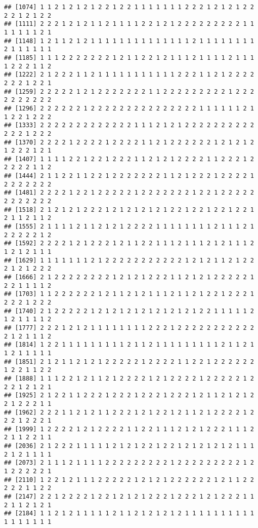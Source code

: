 \documentclass[
]{article}
\begin{document}
\begin{verbatim}
## [1074] 1 1 2 1 2 1 2 1 2 2 1 2 2 1 1 1 1 1 1 1 2 2 2 1 2 1 2 1 2 2 2 2 1 2 1 2 2
## [1111] 2 2 2 1 2 1 2 1 1 2 1 1 1 1 2 2 1 2 1 2 2 2 2 2 2 2 2 2 1 1 1 1 1 1 1 2 1
## [1148] 1 2 1 1 2 1 2 1 1 1 1 1 1 1 1 1 1 1 1 1 1 2 1 1 1 1 1 1 1 1 2 1 1 1 1 1 1
## [1185] 1 1 1 2 2 2 2 2 2 2 1 2 1 1 2 2 1 2 1 1 1 2 1 1 1 1 2 1 1 1 1 2 2 2 1 1 2
## [1222] 2 1 2 2 2 1 1 2 1 1 1 1 1 1 1 1 1 1 1 2 2 2 1 1 2 1 2 2 2 2 2 2 2 1 2 2 1
## [1259] 2 2 2 2 2 1 2 1 2 2 2 2 2 2 2 1 1 2 2 2 2 2 2 2 2 2 1 2 2 2 2 2 2 2 2 2 2
## [1296] 2 2 2 2 2 2 1 2 2 2 2 2 2 2 2 2 2 2 2 2 2 2 1 1 1 1 1 1 2 1 1 2 2 1 2 2 2
## [1333] 2 2 2 2 2 2 2 2 2 2 2 2 2 1 1 1 2 1 2 1 2 2 2 2 2 2 2 2 2 2 2 2 2 1 2 2 2
## [1370] 2 2 2 2 1 2 2 2 2 1 2 2 2 2 1 1 2 1 2 2 2 2 2 2 1 2 1 2 1 2 1 2 2 2 1 2 1
## [1407] 1 1 1 1 2 2 1 2 2 1 2 2 2 1 1 2 1 2 1 2 2 2 2 1 1 2 2 2 1 2 2 2 2 2 1 1 2
## [1444] 2 1 1 2 2 1 1 2 2 1 2 2 2 2 2 2 2 1 1 2 1 2 2 2 1 2 2 2 2 1 2 2 2 2 2 2 2
## [1481] 2 2 2 2 1 2 2 1 2 2 2 2 2 1 2 2 2 2 2 2 2 1 2 2 1 2 2 2 2 2 2 2 2 2 2 2 2
## [1518] 2 1 2 1 2 1 2 2 2 1 2 1 2 1 2 1 2 1 2 2 1 2 2 1 2 2 1 2 2 1 2 1 1 2 1 1 2
## [1555] 2 1 1 1 1 2 1 1 2 1 2 1 2 2 2 2 1 1 1 1 1 1 1 1 2 1 1 1 2 1 2 2 2 2 2 1 2
## [1592] 2 2 2 2 1 2 1 2 2 2 1 2 1 1 2 2 1 1 1 2 1 1 1 2 1 2 1 1 1 2 1 2 1 2 1 1 1
## [1629] 1 1 1 1 1 1 1 2 1 2 2 2 2 2 2 2 2 2 2 2 1 2 1 2 1 1 2 1 2 2 2 1 2 1 2 2 2
## [1666] 2 1 2 2 2 2 2 2 2 2 1 2 1 2 1 2 2 2 1 1 2 1 2 1 2 2 2 2 2 1 2 2 1 1 1 1 2
## [1703] 1 1 2 2 2 2 2 2 1 2 1 1 2 1 2 1 1 1 2 1 1 2 1 2 2 1 2 2 2 1 2 2 2 1 2 2 2
## [1740] 2 1 2 2 2 2 2 1 2 1 2 1 2 1 2 1 2 1 2 1 2 1 2 2 1 1 1 1 1 2 1 2 1 1 1 1 2
## [1777] 2 2 2 1 2 1 2 1 1 1 1 1 1 1 1 2 2 2 1 2 2 2 2 2 2 2 2 2 2 2 2 1 2 1 1 1 2
## [1814] 1 2 2 1 1 1 1 1 1 1 1 1 2 1 1 2 1 1 1 1 1 1 1 1 1 2 1 1 2 1 1 2 1 1 1 1 1
## [1851] 2 1 2 1 1 2 1 2 1 2 2 2 2 2 1 2 2 2 2 1 1 2 2 1 2 2 2 2 2 2 1 2 2 1 1 2 2
## [1888] 1 1 1 2 2 1 2 1 1 2 1 2 2 2 2 1 2 1 2 2 2 2 1 2 2 2 2 2 1 2 2 2 1 2 1 2 1
## [1925] 2 1 2 2 1 1 2 2 2 1 2 2 2 1 2 2 2 1 2 2 2 1 2 1 1 2 1 2 1 2 2 1 2 2 2 1 1
## [1962] 2 2 2 1 1 2 1 2 1 1 2 2 2 1 2 1 2 2 1 2 1 1 2 1 2 2 2 2 1 2 2 2 1 2 2 2 1
## [1999] 1 2 2 2 2 1 2 1 2 2 2 2 1 1 2 2 1 1 1 2 1 2 1 2 2 2 1 1 1 2 2 1 1 2 2 1 1
## [2036] 2 1 2 2 2 1 1 1 1 1 2 1 2 1 2 2 1 2 2 1 2 1 2 1 2 1 2 1 1 1 2 1 2 1 1 1 1
## [2073] 2 1 1 1 2 1 1 1 1 2 2 2 2 2 2 2 2 2 1 2 2 2 2 2 2 2 2 2 1 2 1 2 2 2 2 2 1
## [2110] 1 2 2 1 2 1 1 1 2 2 2 2 2 1 2 1 2 1 2 2 2 2 2 2 1 2 1 1 2 2 2 2 2 1 1 2 2
## [2147] 2 2 1 2 2 2 2 1 2 2 1 2 1 2 1 2 2 2 1 2 2 2 1 2 1 2 2 2 1 1 2 1 1 2 1 2 1
## [2184] 1 1 2 1 2 1 1 1 1 1 2 1 1 2 1 2 1 2 1 2 1 1 1 1 1 1 1 1 1 1 1 1 1 1 1 1 1

\end{verbatim}
\end{document}
